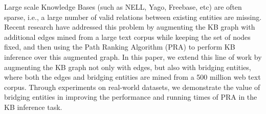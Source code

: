 Large scale Knowledge Bases (such as NELL, Yago, Freebase, etc) are often sparse, i.e., a large number of valid relations between existing entities are missing. Recent research have addressed this problem by augmenting the KB graph with additional edges mined from a large text corpus while keeping the set of nodes fixed, and then using the Path Ranking Algorithm (PRA) to perform KB inference over this augmented graph. In this paper, we extend this line of work by augmenting the KB graph not only with edges, but also with bridging entities, where both the edges and  bridging entities are mined from a 500 million web text corpus. Through experiments on real-world datasets, we demonstrate the value of bridging entities in improving the performance and running times of PRA in the KB inference task.

